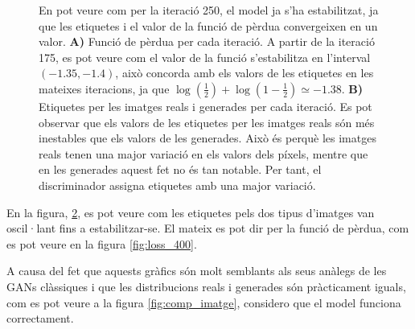 \begin{figure}[H]
\begin{subfigure}{0.5\textwidth}
		\caption{} \label{fig:labels_400}
	\end{subfigure}
	\caption{En pot veure com per la iteració 250, el model ja s'ha estabilitzat, ja que les etiquetes i el valor de la funció de pèrdua convergeixen en un valor. \textbf{A)} Funció de pèrdua per cada iteració. A partir de la iteració 175, es pot veure com el valor de la funció s'estabilitza en l'interval $(-1.35, -1.4)$, això concorda amb els valors de les etiquetes en les mateixes iteracions, ja que $\log(\frac{1}{2}) + \log(1-\frac{1}{2}) \simeq -1.38$. \textbf{B)} Etiquetes per les imatges reals i generades per cada iteració. Es pot observar que els valors de les etiquetes per les imatges reals són més inestables que els valors de les generades. Això és perquè les imatges reals tenen una major variació en els valors dels píxels, mentre que en les generades aquest fet no és tan notable. Per tant, el discriminador assigna etiquetes amb una major variació.}
\end{figure}

En la figura, \ref{fig:labels_400}, es pot veure com les etiquetes pels dos tipus d'imatges van oscil·lant fins a estabilitzar-se. El mateix es pot dir per la funció de pèrdua, com es pot veure en la figura \ref{fig:loss_400}.  

A causa del fet que aquests gràfics són molt semblants als seus anàlegs de les GANs clàssiques i que les distribucions reals i generades són pràcticament iguals, com es pot veure a la figura \ref{fig:comp_imatge}, considero que el model funciona correctament.



